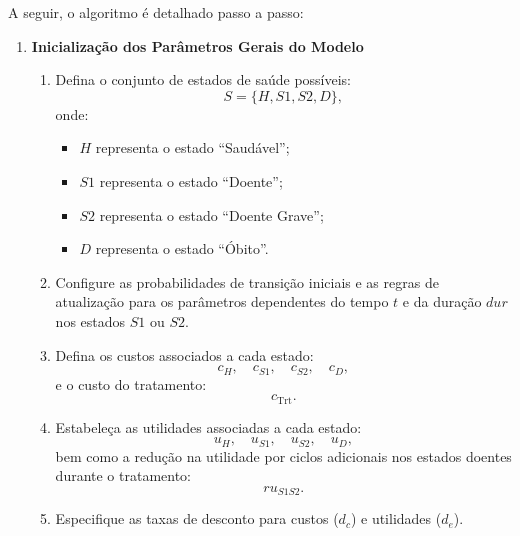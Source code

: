 \documentclass[12pt, a4paper, openany]{book}
\numberwithin{equation}{chapter}
\numberwithin{table}{chapter}
\numberwithin{figure}{chapter}
\theoremstyle{break}
\begin{document}
A seguir, o algoritmo é detalhado passo a passo:

\begin{enumerate}
    \item \textbf{Inicialização dos Parâmetros Gerais do Modelo}
    \begin{enumerate}[label=\alph*)]
        \item Defina o conjunto de estados de saúde possíveis:
        \[
        S = \{H, S1, S2, D\},
        \]
        onde:
        \begin{itemize}
            \item $H$ representa o estado ``Saudável'';
            \item $S1$ representa o estado ``Doente'';
            \item $S2$ representa o estado ``Doente Grave'';
            \item $D$ representa o estado ``Óbito''.
        \end{itemize}
        \item Configure as probabilidades de transição iniciais e as regras de atualização para os parâmetros dependentes do tempo $t$ e da duração $dur$ nos estados $S1$ ou $S2$.
        \item Defina os custos associados a cada estado:
        \[
        c_H, \quad c_{S1}, \quad c_{S2}, \quad c_D,
        \]
        e o custo do tratamento:
        \[
        c_{\text{Trt}}.
        \]
        \item Estabeleça as utilidades associadas a cada estado:
        \[
        u_H, \quad u_{S1}, \quad u_{S2}, \quad u_D,
        \]
        bem como a redução na utilidade por ciclos adicionais nos estados doentes durante o tratamento:
        \[
        ru_{S1S2}.
        \]
        \item Especifique as taxas de desconto para custos ($d_c$) e utilidades ($d_e$).
    \end{enumerate}
    

\end{enumerate}
\end{document}
